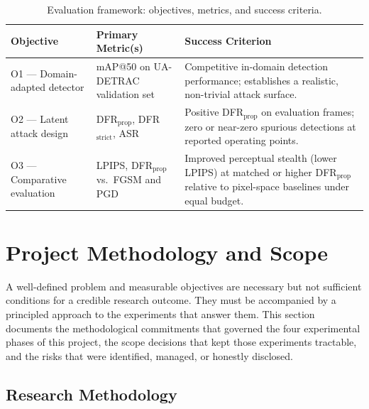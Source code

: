 \documentclass[12pt,a4paper]{report}
\begin{document}
\begin{table}[htbp]
  \centering
  \caption{Evaluation framework: objectives, metrics,
           and success criteria.}
  \label{tab:eval_criteria}
  \small
  \renewcommand{\arraystretch}{1.35}
  \begin{tabular}{@{} p{3.8cm} p{3.8cm} p{5.6cm} @{}}
    \toprule
    \textbf{Objective} & \textbf{Primary Metric(s)}
                       & \textbf{Success Criterion} \\
    \midrule
    O1 --- Domain-adapted detector
      & mAP@50 on UA-DETRAC validation set
      & Competitive in-domain detection performance;
        establishes a realistic, non-trivial attack surface. \\
    \addlinespace
    O2 --- Latent attack design
      & DFR$_{\text{prop}}$, DFR$_{\text{strict}}$, ASR
      & Positive DFR$_{\text{prop}}$ on evaluation frames;
        zero or near-zero spurious detections at reported
        operating points. \\
    \addlinespace
    O3 --- Comparative evaluation
      & LPIPS, DFR$_{\text{prop}}$ vs.\ FGSM and PGD
      & Improved perceptual stealth (lower LPIPS) at
        matched or higher DFR$_{\text{prop}}$ relative
        to pixel-space baselines under equal budget. \\
    \bottomrule
  \end{tabular}
\end{table}

\section{Project Methodology and Scope}
\label{sec:methodology}

A well-defined problem and measurable objectives are necessary
but not sufficient conditions for a credible research outcome.
They must be accompanied by a principled approach to the
experiments that answer them. This section documents the
methodological commitments that governed the four experimental
phases of this project, the scope decisions that kept those
experiments tractable, and the risks that were identified,
managed, or honestly disclosed.

\subsection{Research Methodology}
\label{sec:research_method}
\end{document}
